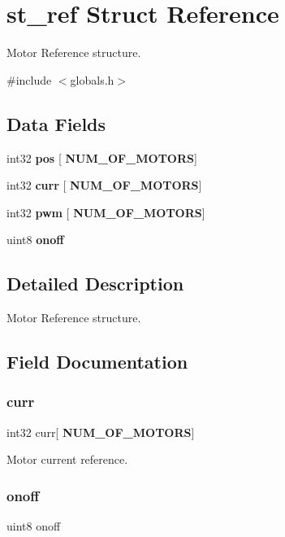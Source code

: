 \section{st\+\_\+ref Struct Reference}
\label{structst__ref}


Motor Reference structure.  




{\ttfamily \#include $<$globals.\+h$>$}

\subsection*{Data Fields}
\begin{DoxyCompactItemize}
\item 
int32 \textbf{ pos} [\textbf{ N\+U\+M\+\_\+\+O\+F\+\_\+\+M\+O\+T\+O\+RS}]
\item 
int32 \textbf{ curr} [\textbf{ N\+U\+M\+\_\+\+O\+F\+\_\+\+M\+O\+T\+O\+RS}]
\item 
int32 \textbf{ pwm} [\textbf{ N\+U\+M\+\_\+\+O\+F\+\_\+\+M\+O\+T\+O\+RS}]
\item 
uint8 \textbf{ onoff}
\end{DoxyCompactItemize}


\subsection{Detailed Description}
Motor Reference structure. 



\subsection{Field Documentation}
\mbox{\label{structst__ref_a035463484308a2613b907a0cbaa4047c}} 
\subsubsection{curr}
{\footnotesize\ttfamily int32 curr[\textbf{ N\+U\+M\+\_\+\+O\+F\+\_\+\+M\+O\+T\+O\+RS}]}

Motor current reference. \mbox{\label{structst__ref_aea636dc117fd774b0cbfc5e936eac3e5}} 
\subsubsection{onoff}
{\footnotesize\ttfamily uint8 onoff}

